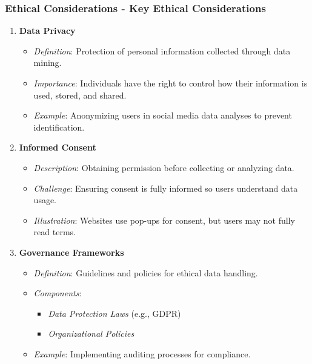 \documentclass[aspectratio=169]{beamer}
\begin{document}
\begin{frame}[fragile]
    \frametitle{Ethical Considerations - Key Ethical Considerations}
    \begin{enumerate}
        \item \textbf{Data Privacy}
        \begin{itemize}
            \item \textit{Definition}: Protection of personal information collected through data mining.
            \item \textit{Importance}: Individuals have the right to control how their information is used, stored, and shared.
            \item \textit{Example}: Anonymizing users in social media data analyses to prevent identification.
        \end{itemize}
        
        \item \textbf{Informed Consent}
        \begin{itemize}
            \item \textit{Description}: Obtaining permission before collecting or analyzing data.
            \item \textit{Challenge}: Ensuring consent is fully informed so users understand data usage.
            \item \textit{Illustration}: Websites use pop-ups for consent, but users may not fully read terms.
        \end{itemize}

        \item \textbf{Governance Frameworks}
        \begin{itemize}
            \item \textit{Definition}: Guidelines and policies for ethical data handling.
            \item \textit{Components}:
            \begin{itemize}
                \item \textit{Data Protection Laws} (e.g., GDPR)
                \item \textit{Organizational Policies}
            \end{itemize}
            \item \textit{Example}: Implementing auditing processes for compliance.
        \end{itemize}
    \end{enumerate}
\end{frame}
\end{document}
